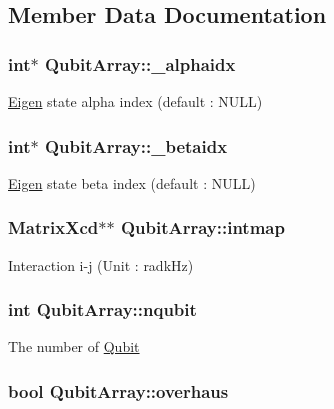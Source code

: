 \subsection{Member Data Documentation}
\hypertarget{structQubitArray_a0a5c3875737d2a3bc14399109e89c82d}{
\subsubsection[{\-\_\-alphaidx}]{\setlength{\rightskip}{0pt plus 5cm}int$\ast$ Qubit\-Array\-::\-\_\-alphaidx}}\label{structQubitArray_a0a5c3875737d2a3bc14399109e89c82d}
\hyperlink{namespaceEigen}{Eigen} state alpha index (default \-: N\-U\-L\-L) \hypertarget{structQubitArray_a93fa20887ef373b3710d0734e9f1b7a4}{
\subsubsection[{\-\_\-betaidx}]{\setlength{\rightskip}{0pt plus 5cm}int$\ast$ Qubit\-Array\-::\-\_\-betaidx}}\label{structQubitArray_a93fa20887ef373b3710d0734e9f1b7a4}
\hyperlink{namespaceEigen}{Eigen} state beta index (default \-: N\-U\-L\-L) \hypertarget{structQubitArray_a1d74d3f22fe851f267c72b8cda416dd0}{
\subsubsection[{intmap}]{\setlength{\rightskip}{0pt plus 5cm}Matrix\-Xcd$\ast$$\ast$ Qubit\-Array\-::intmap}}\label{structQubitArray_a1d74d3f22fe851f267c72b8cda416dd0}
Interaction i-\/j (Unit \-: radk\-Hz) \hypertarget{structQubitArray_ac87a8cdf149336447fe601f59c7ff371}{
\subsubsection[{nqubit}]{\setlength{\rightskip}{0pt plus 5cm}int Qubit\-Array\-::nqubit}}\label{structQubitArray_ac87a8cdf149336447fe601f59c7ff371}
The number of \hyperlink{structQubit}{Qubit} \hypertarget{structQubitArray_ab1cb38fcd5640338fad8c2abc868b53e}{
\subsubsection[{overhaus}]{\setlength{\rightskip}{0pt plus 5cm}bool Qubit\-Array\-::overhaus}}\label{structQubitArray_ab1cb38fcd5640338fad8c2abc868b53e}
